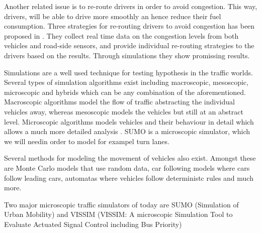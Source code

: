 Another related issue is to re-route drivers in order to avoid congestion. This way, drivers, will be able to drive more smoothly an hence reduce their fuel consumption. 
Three strategies for re-routing drivers to avoid congestion has been proposed in \cite{congestionAvoidance}. 
They collect real time data on the congestion levels from both vehicles and road-side sensors, and provide individual re-routing strategies to the drivers based on the results. Through simulations they show promissing results.

Simulations are a well used technique for testing hypothesis in the traffic worlds.
Several types of simulation algorithms exist including macroscopic, mesoscopic, microscopic and hybrids which can be any combination of the aforementioned. 
Macroscopic algorithms model the flow of traffic abstracting the individual vehicles away, whereas mesoscopic models the vehicles but still at an abstract level. 
Microscopic algorithms models vehicles and their behaviour in detail which allows a much more detailed analysis \cite{meso-micro}. 
SUMO is a microscopic simulator, which we will needin order to model for exampel turn lanes.

Several methods for modeling the movement of vehicles also exist. Amongst these are Monte Carlo models \cite{} that use random data, car following models \cite{} where cars follow leading cars, automatas where vehicles follow deterministc rules \cite{} and much more.

Two major microscopic traffic simulators of today are SUMO (Simulation of Urban Mobility)\cite{sumo} and VISSIM (VISSIM: A microscopic Simulation Tool to Evaluate Actuated Signal Control including Bus Priority)








